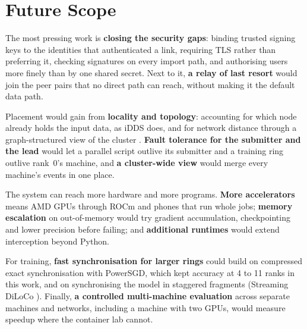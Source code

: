 \chapter{Future Scope}
\label{sec:future}

The most pressing work is \textbf{closing the security gaps}: binding trusted
signing keys to the identities that authenticated a link, requiring TLS rather
than preferring it, checking signatures on every import path, and authorising
users more finely than by one shared secret. Next to it, \textbf{a relay of last
resort} would join the peer pairs that no direct path can reach, without making
it the default data path.

Placement would gain from \textbf{locality and topology}: accounting for which
node already holds the input data, as iDDS \cite{idds2025} does, and for
network distance through a graph-structured view of the cluster
\cite{zhao2023}. \textbf{Fault tolerance for the submitter and the lead} would
let a parallel script outlive its submitter and a training ring outlive rank~0's
machine, and \textbf{a cluster-wide view} would merge every machine's events in
one place.

The system can reach more hardware and more programs. \textbf{More accelerators}
means AMD GPUs through ROCm and phones that run whole jobs; \textbf{memory
escalation} on out-of-memory would try gradient accumulation, checkpointing and
lower precision before failing; and \textbf{additional runtimes} would extend
interception beyond Python.

For training, \textbf{fast synchronisation for larger rings} could build on
compressed exact synchronisation with PowerSGD, which kept accuracy at 4 to 11
ranks in this work, and on synchronising the model in staggered fragments
(Streaming DiLoCo \cite{douillard2025streaming}). Finally, \textbf{a controlled
multi-machine evaluation} across separate machines and networks, including a
machine with two GPUs, would measure speedup where the container lab cannot.
